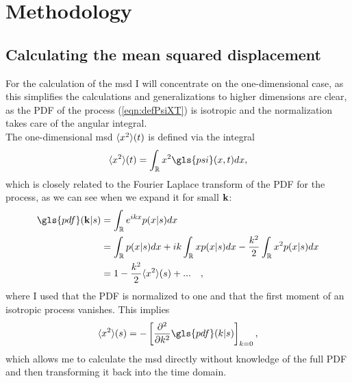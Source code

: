 \chapter{Methodology}



\section{Calculating the mean squared displacement} 

For the calculation of the \gls{msd} I will concentrate on the one-dimensional case, as this simplifies the calculations and generalizations to higher dimensions are clear, as the \gls{PDF} of the process (\ref{eqn:defPsiXT}) is isotropic and the normalization takes care of the angular integral. \\

The one-dimensional \gls{msd} $\langle x^2 \rangle(t)$ is defined via the integral 
%
\begin{align}
\mean{x^2}(t) = \int_{\mathbb{R}} x^2 \gls{psi}(x,t) dx ,
\end{align}
%
which is closely related to the Fourier Laplace transform of the \gls{PDF} for the process, as we can see when we expand it for small $\mathbf{ k }$:
%
\begin{align}
\gls{pdf}(\ve{k}|s) &= \int_{\mathbb{R}}  e^{ik x} p(x|s) dx  \\
&= \int_{\mathbb{R}}   p(x|s) dx +  i k \int_{\mathbb{R}}   x p(x|s) dx - \frac{k^2}{2} \int_{\mathbb{R}}   x^2 p(x|s) dx \\
&= 1 - \frac{k^2}{2} \mean{x^2}(s)  + ... \quad ,
\end{align}
%
where I used that the \gls{PDF} is normalized to one and that the first moment of an isotropic process vanishes. This implies 
%
\begin{align}
\mean{x^2}(s) = - \left[ \npder{}{k}{2} \gls{pdf}(k|s) \right]_{k=0},
\end{align}
%
which allows me to calculate the \gls{msd} directly without knowledge of the full \gls{PDF} and then transforming it back into the time domain.\\


